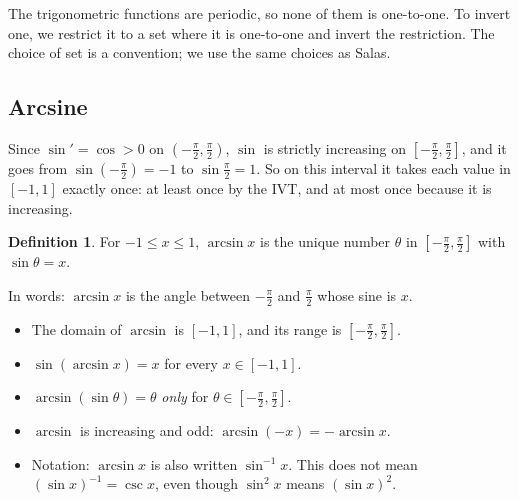 \documentclass[12pt,letterpaper]{article}
\theoremstyle{definition}
\newtheorem{definition}[theorem]{Definition}
\begin{document}
The trigonometric functions are periodic, so none of them is one-to-one. To
invert one, we restrict it to a set where it is one-to-one and invert the
restriction. The choice of set is a convention; we use the same choices as
Salas.

\subsection{Arcsine}

Since $\sin'=\cos>0$ on $(-\frac\pi2,\frac\pi2)$, $\sin$ is strictly
increasing on $[-\frac\pi2,\frac\pi2]$, and it goes from
$\sin(-\frac\pi2)=-1$ to $\sin\frac\pi2=1$. So on this interval it takes each
value in $[-1,1]$ exactly once: at least once by the IVT, and at most once
because it is increasing.

\begin{definition}
  For $-1\leq x\leq1$, $\arcsin x$ is the unique number $\theta$ in
  $[-\frac\pi2,\frac\pi2]$ with $\sin\theta=x$.
\end{definition}

In words: $\arcsin x$ is the angle between $-\frac\pi2$ and $\frac\pi2$ whose
sine is $x$.
\begin{itemize}[itemsep=0.2em]
  \item The domain of $\arcsin$ is $[-1,1]$, and its range is
    $[-\frac\pi2,\frac\pi2]$.
  \item $\sin(\arcsin x)=x$ for every $x\in[-1,1]$.
  \item $\arcsin(\sin\theta)=\theta$ \emph{only} for
    $\theta\in[-\frac\pi2,\frac\pi2]$.
  \item $\arcsin$ is increasing and odd: $\arcsin(-x)=-\arcsin x$.
  \item Notation: $\arcsin x$ is also written $\sin^{-1}x$. This does not
    mean $(\sin x)^{-1}=\csc x$, even though $\sin^2x$ means $(\sin x)^2$.
\end{itemize}

\begin{center}
\end{center}
\end{document}
